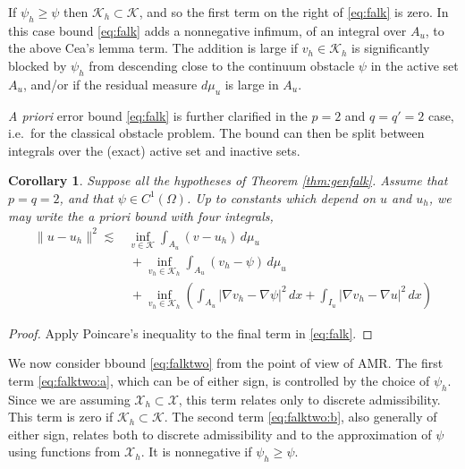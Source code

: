 \documentclass[]{interact}
\theoremstyle{plain}%
\newtheorem{corollary}[theorem]{Corollary}
\theoremstyle{definition}
\theoremstyle{remark}
\newcommand{\grad}{\nabla}
\newcommand{\cK}{\mathcal{K}}
\newcommand{\cX}{\mathcal{X}}
\begin{document}
If $\psi_h\ge \psi$ then $\cK_h\subset \cK$, and so the first term on the right of \eqref{eq:falk} is zero.  In this case bound \eqref{eq:falk} adds a nonnegative infimum, of an integral over $A_u$, to the above Cea's lemma term.  The addition is large if $v_h\in\cK_h$ is significantly blocked by $\psi_h$ from descending close to the continuum obstacle $\psi$ in the active set $A_u$, and/or if the residual measure $d\mu_u$ is large in $A_u$.

\emph{A priori} error bound \eqref{eq:falk} is further clarified in the $p=2$ and $q=q'=2$ case, i.e.~for the classical obstacle problem.  The bound can then be split between integrals over the (exact) active set and inactive sets.

\begin{corollary} \label{cor:falktwo}
Suppose all the hypotheses of Theorem \ref{thm:genfalk}.  Assume that $p=q=2$, and that $\psi \in C^1(\Omega)$.  Up to constants which depend on $u$ and $u_h$, we may write the \emph{a priori} bound with four integrals,
\begin{subequations}
\label{eq:falktwo}
\begin{align}
\|u-u_h\|^2 \lesssim &\inf_{v\in\cK} \int_{A_u} (v-u_h)\,d\mu_u \label{eq:falktwo:a} \\
&\, + \inf_{v_h\in\cK_h} \int_{A_u} (v_h-\psi)\,d\mu_u \label{eq:falktwo:b} \\
&\, + \inf_{v_h\in\cK_h} \left(\int_{A_u} |\grad v_h - \grad \psi|^2\,dx + \int_{I_u} |\grad v_h - \grad u|^2\,dx\right) \label{eq:falktwo:c}
\end{align}
\end{subequations}
\end{corollary}

\begin{proof}
Apply Poincare's inequality to the final term in \eqref{eq:falk}.
\end{proof}

We now consider bbound \eqref{eq:falktwo} from the point of view of AMR.  The first term \eqref{eq:falktwo:a}, which can be of either sign, is controlled by the choice of $\psi_h$.  Since we are assuming $\cX_h\subset \cX$, this term relates only to discrete admissibility.  This term is zero if $\cK_h \subset \cK$.  The second term \eqref{eq:falktwo:b}, also generally of either sign, relates both to discrete admissibility and to the approximation of $\psi$ using functions from $\cX_h$.  It is nonnegative if $\psi_h\ge \psi$.
\end{document}
